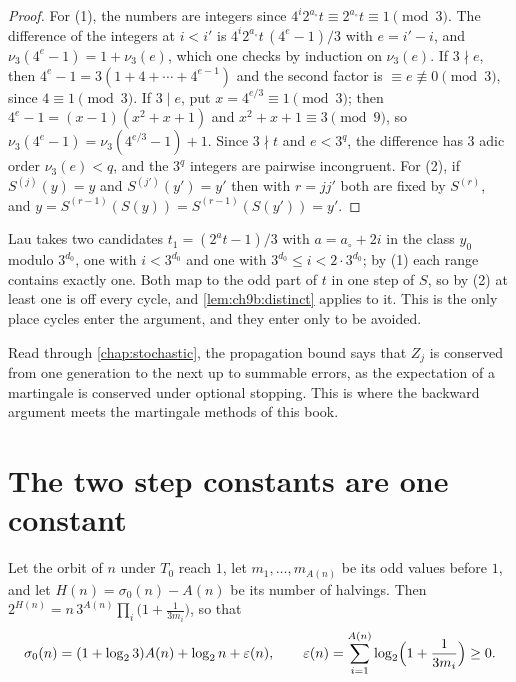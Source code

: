 \begin{proof}
For (1), the numbers are integers since $4^i2^{a_\circ}t\equiv2^{a_\circ}t\equiv1\pmod3$. The difference of the integers at $i<i'$ is $4^{i}2^{a_\circ}t\,(4^{e}-1)/3$ with $e=i'-i$, and $\nu_3(4^{e}-1)=1+\nu_3(e)$, which one checks by induction on $\nu_3(e)$. If $3\nmid e$, then $4^e-1=3(1+4+\cdots+4^{e-1})$ and the second factor is $\equiv e\not\equiv0\pmod3$, since $4\equiv1\pmod3$. If $3\mid e$, put $x=4^{e/3}\equiv1\pmod3$; then $4^e-1=(x-1)(x^2+x+1)$ and $x^2+x+1\equiv3\pmod9$, so $\nu_3(4^e-1)=\nu_3(4^{e/3}-1)+1$. Since $3\nmid t$ and $e<3^q$, the difference has $3$ adic order $\nu_3(e)<q$, and the $3^{q}$ integers are pairwise incongruent. For (2), if $S^{(j)}(y)=y$ and $S^{(j')}(y')=y'$ then with $r=jj'$ both are fixed by $S^{(r)}$, and $y=S^{(r-1)}(S(y))=S^{(r-1)}(S(y'))=y'$.
\end{proof}

Lau takes two candidates $t_1=(2^at-1)/3$ with $a=a_\circ+2i$ in the class $y_0$ modulo $3^{d_0}$, one with $i<3^{d_0}$ and one with $3^{d_0}\le i<2\cdot3^{d_0}$; by (1) each range contains exactly one. Both map to the odd part of $t$ in one step of $S$, so by (2) at least one is off every cycle, and \cref{lem:ch9b:distinct} applies to it. This is the only place cycles enter the argument, and they enter only to be avoided.

Read through \cref{chap:stochastic}, the propagation bound says that $Z_j$ is conserved from one generation to the next up to summable errors, as the expectation of a martingale is conserved under optional stopping. This is where the backward argument meets the martingale methods of this book.

\section{The two step constants are one constant}\label{sec:ch9b:constants}

\begin{proposition}\label{prop:ch9b:steps}
Let the orbit of $n$ under $T_0$ reach $1$, let $m_1,\ldots,m_{A(n)}$ be its odd values before $1$, and let $H(n)=\sigma_0(n)-A(n)$ be its number of halvings. Then $2^{H(n)}=n\,3^{A(n)}\prod_i\bigl(1+\frac1{3m_i}\bigr)$, so that
\begin{equation}\label{eq:ch9b:steps}
  \sigma_0(n)=(1+\log_2 3)A(n)+\log_2n+\varepsilon(n),\qquad \varepsilon(n)=\sum_{i=1}^{A(n)}\log_2\Bigl(1+\frac1{3m_i}\Bigr)\ge0 .
\end{equation}
\end{proposition}

